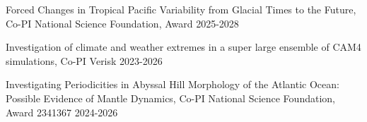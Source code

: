 \begin{cvhonors}

\vspace{1.5em} %
\cvhonor
{Forced Changes in Tropical Pacific Variability from Glacial Times to the Future, Co-PI}
{National Science Foundation, Award }
{}
{2025-2028}

\vspace{3em}
\cvhonor
{Investigation of climate and weather extremes in a super large ensemble of CAM4 simulations, Co-PI} 
{Verisk}
{}
{2023-2026}

\vspace{3em}
\cvhonor
    {Investigating Periodicities in Abyssal Hill Morphology of the Atlantic Ocean: Possible Evidence of Mantle Dynamics, Co-PI} %
    {National Science Foundation, Award 2341367} %
    {} %
    {2024-2026} %


\end{cvhonors}
